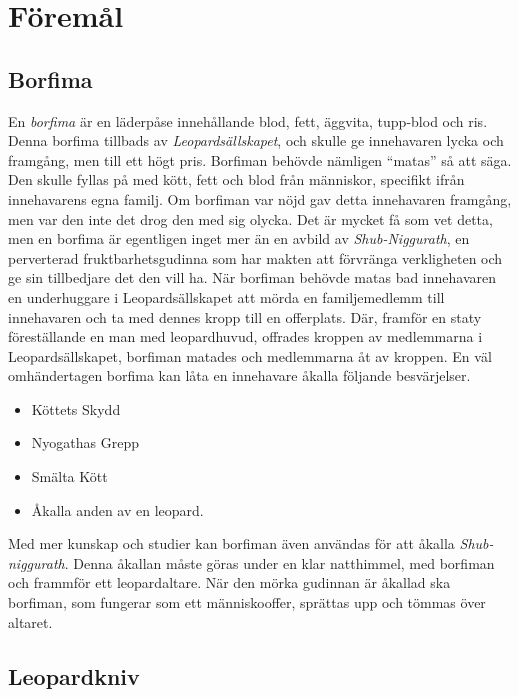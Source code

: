 \section{Föremål}
\subsection{Borfima}
\label{itm:Borrfima}
%
En \textit{borfima} är en läderpåse innehållande blod, fett, äggvita, tupp-blod och ris. Denna borfima tillbads av \textit{Leopardsällskapet}, och skulle ge innehavaren lycka och framgång, men till ett högt pris. Borfiman behövde nämligen ``matas'' så att säga. Den skulle fyllas på med kött, fett och blod från människor, specifikt ifrån innehavarens egna familj. Om borfiman var nöjd gav detta innehavaren framgång, men var den inte det drog den med sig olycka. Det är mycket få som vet detta, men en borfima är egentligen inget mer än en avbild av \textit{Shub-Niggurath}, en perverterad fruktbarhetsgudinna som har makten att förvränga verkligheten och ge sin tillbedjare det den vill ha. När borfiman behövde matas bad innehavaren en underhuggare i Leopardsällskapet att mörda en familjemedlemm till innehavaren och ta med dennes kropp till en offerplats. Där, framför en staty föreställande en man med leopardhuvud, offrades kroppen av medlemmarna i Leopardsällskapet, borfiman matades och medlemmarna åt av kroppen. En väl omhändertagen borfima kan låta en innehavare åkalla följande besvärjelser.
%
\begin{itemize}
	\item Köttets Skydd
	\item Nyogathas Grepp
	\item Smälta Kött
	\item Åkalla anden av en leopard.
\end{itemize}
%
Med mer kunskap och studier kan borfiman även användas för att åkalla \textit{Shub-niggurath}. Denna åkallan måste göras under en klar natthimmel, med borfiman och frammför ett leopardaltare. När den mörka gudinnan är åkallad ska borfiman, som fungerar som ett människooffer, sprättas upp och tömmas över altaret.

\subsection{Leopardkniv}
\label{itm:Leopardkniv}
